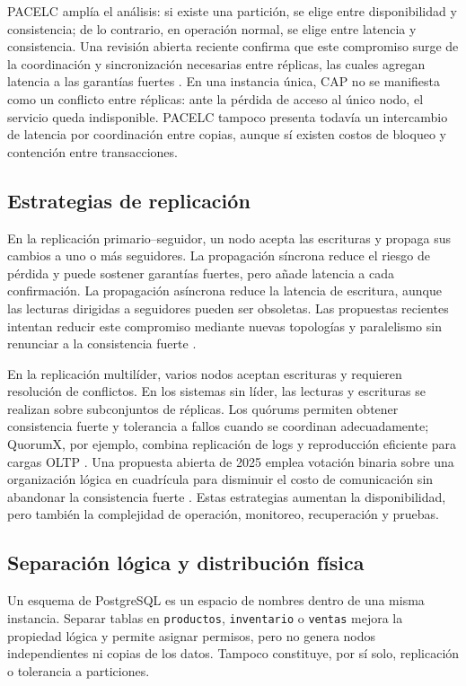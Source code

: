 \documentclass[11pt,a4paper]{article}
\begin{document}
PACELC amplía el análisis: si existe una partición, se elige entre disponibilidad y consistencia; de lo contrario, en operación normal, se elige entre latencia y consistencia. Una revisión abierta reciente confirma que este compromiso surge de la coordinación y sincronización necesarias entre réplicas, las cuales agregan latencia a las garantías fuertes \cite{ahmed2023tradeoffs}. En una instancia única, CAP no se manifiesta como un conflicto entre réplicas: ante la pérdida de acceso al único nodo, el servicio queda indisponible. PACELC tampoco presenta todavía un intercambio de latencia por coordinación entre copias, aunque sí existen costos de bloqueo y contención entre transacciones.

\subsection{Estrategias de replicación}

En la replicación primario--seguidor, un nodo acepta las escrituras y propaga sus cambios a uno o más seguidores. La propagación síncrona reduce el riesgo de pérdida y puede sostener garantías fuertes, pero añade latencia a cada confirmación. La propagación asíncrona reduce la latencia de escritura, aunque las lecturas dirigidas a seguidores pueden ser obsoletas. Las propuestas recientes intentan reducir este compromiso mediante nuevas topologías y paralelismo sin renunciar a la consistencia fuerte \cite{altukhaim2022multidirectional}.

En la replicación multilíder, varios nodos aceptan escrituras y requieren resolución de conflictos. En los sistemas sin líder, las lecturas y escrituras se realizan sobre subconjuntos de réplicas. Los quórums permiten obtener consistencia fuerte y tolerancia a fallos cuando se coordinan adecuadamente; QuorumX, por ejemplo, combina replicación de logs y reproducción eficiente para cargas OLTP \cite{wang2022quorumx}. Una propuesta abierta de 2025 emplea votación binaria sobre una organización lógica en cuadrícula para disminuir el costo de comunicación sin abandonar la consistencia fuerte \cite{fauzi2025bvac}. Estas estrategias aumentan la disponibilidad, pero también la complejidad de operación, monitoreo, recuperación y pruebas.

\subsection{Separación lógica y distribución física}

Un esquema de PostgreSQL es un espacio de nombres dentro de una misma instancia. Separar tablas en \texttt{productos}, \texttt{inventario} o \texttt{ventas} mejora la propiedad lógica y permite asignar permisos, pero no genera nodos independientes ni copias de los datos. Tampoco constituye, por sí solo, replicación o tolerancia a particiones.
\end{document}
